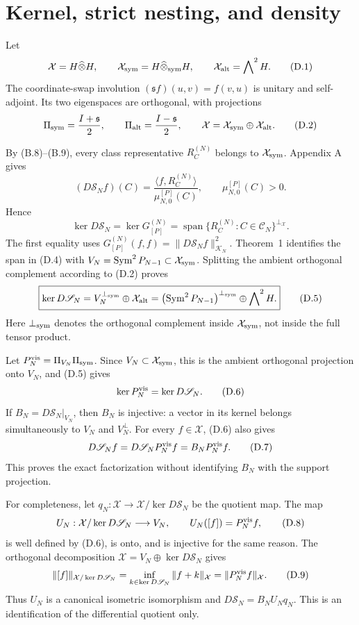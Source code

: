 \documentclass[11pt]{article}
\begin{document}
\section{Kernel, strict nesting, and density}

Let \[ \mathcal X=H\widehat\otimes H, \qquad \mathcal X_{\rm sym}=H\widehat\otimes_{\rm sym}H, \qquad \mathcal X_{\rm alt}=\bigwedge\nolimits^2H. \tag{D.1} \] The coordinate-swap involution \((\mathfrak s f)(u,v)=f(v,u)\) is unitary and self-adjoint. Its two eigenspaces are orthogonal, with projections \[ \Pi_{\rm sym}=\frac{I+\mathfrak s}{2}, \qquad \Pi_{\rm alt}=\frac{I-\mathfrak s}{2}, \qquad \mathcal X=\mathcal X_{\rm sym}\oplus\mathcal X_{\rm alt}. \tag{D.2} \]

By (B.8)--(B.9), every class representative \(R_C^{(N)}\) belongs to \(\mathcal X_{\rm sym}\). Appendix A gives \[ (D\mathscr S_Nf)(C) =\frac{\langle f,R_C^{(N)}\rangle}{\mu_{N,0}^{[P]}(C)}, \qquad \mu_{N,0}^{[P]}(C)>0. \tag{D.3} \] Hence \[ \ker D\mathscr S_N =\ker G_{[P]}^{(N)} =\operatorname{span}\{R_C^{(N)}:C\in\mathcal C_N\}^{\perp_{\mathcal X}}. \tag{D.4} \] The first equality uses \(G_{[P]}^{(N)}(f,f)=\|D\mathscr S_Nf\|_{\mathcal K_N}^2\). Theorem~1 identifies the span in (D.4) with \(V_N=\operatorname{Sym}^2P_{N-1}\subset\mathcal X_{\rm sym}\). Splitting the ambient orthogonal complement according to (D.2) proves \[ \boxed{ \ker D\mathscr S_N =V_N^{\perp_{\rm sym}}\oplus\mathcal X_{\rm alt} =\left(\operatorname{Sym}^2P_{N-1}\right)^{\perp_{\rm sym}} \oplus\bigwedge\nolimits^2H.} \tag{D.5} \] Here \(\perp_{\rm sym}\) denotes the orthogonal complement inside \(\mathcal X_{\rm sym}\), not inside the full tensor product.

Let \(P_N^{\rm vis}=\Pi_{V_N}\Pi_{\rm sym}\). Since \(V_N\subset\mathcal X_{\rm sym}\), this is the ambient orthogonal projection onto \(V_N\), and (D.5) gives \[ \ker P_N^{\rm vis}=\ker D\mathscr S_N. \tag{D.6} \] If \(B_N=D\mathscr S_N|_{V_N}\), then \(B_N\) is injective: a vector in its kernel belongs simultaneously to \(V_N\) and \(V_N^\perp\). For every \(f\in\mathcal X\), (D.6) also gives \[ D\mathscr S_Nf =D\mathscr S_NP_N^{\rm vis}f =B_NP_N^{\rm vis}f. \tag{D.7} \] This proves the exact factorization without identifying \(B_N\) with the support projection.

For completeness, let \(q_N:\mathcal X\to\mathcal X/\ker D\mathscr S_N\) be the quotient map. The map \[ U_N:\mathcal X/\ker D\mathscr S_N\longrightarrow V_N, \qquad U_N([f])=P_N^{\rm vis}f, \tag{D.8} \] is well defined by (D.6), is onto, and is injective for the same reason. The orthogonal decomposition \(\mathcal X=V_N\oplus\ker D\mathscr S_N\) gives \[ \|[f]\|_{\mathcal X/\ker D\mathscr S_N} =\inf_{k\in\ker D\mathscr S_N}\|f+k\|_{\mathcal X} =\|P_N^{\rm vis}f\|_{\mathcal X}. \tag{D.9} \] Thus \(U_N\) is a canonical isometric isomorphism and \(D\mathscr S_N=B_NU_Nq_N\). This is an identification of the differential quotient only.
\end{document}
